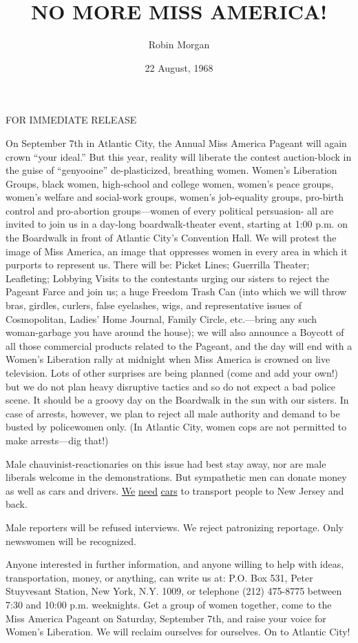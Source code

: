 \documentclass{article}
\title{NO MORE MISS AMERICA!}
\author{Robin Morgan}
\date{22 August, 1968}
\begin{document}
\maketitle

FOR IMMEDIATE RELEASE

On September 7th in Atlantic City, the Annual Miss America Pageant will again
crown ``your ideal.'' But this year, reality will liberate the contest
auction-block in the guise of ``genyooine'' de-plasticized, breathing women.
Women's Liberation Groups, black women, high-school and college women, women’s
peace groups, women's welfare and social-work groups, women's job-equality
groups, pro-birth control and pro-abortion groups---women of every political
persuasion- all are invited to join us in a day-long boardwalk-theater event,
starting at 1:00 p.m. on the Boardwalk in front of Atlantic City's Convention
Hall. We will protest the image of Miss America, an image that oppresses women
in every area in which it purports to represent us. There will be: Picket
Lines; Guerrilla Theater; Leafleting; Lobbying Visits to the contestants urging
our sisters to reject the Pageant Farce and join us; a huge Freedom Trash Can
(into which we will throw bras, girdles, curlers, false eyelashes, wigs, and
representative issues of Cosmopolitan, Ladies' Home Journal, Family Circle,
etc.---bring any such woman-garbage you have around the house); we will also
announce a Boycott of all those commercial products related to the Pageant, and
the day will end with a Women's Liberation rally at midnight when Miss America
is crowned on live television. Lots of other surprises are being planned (come
and add your own!) but we do not plan heavy disruptive tactics and so do not
expect a bad police scene. It should be a groovy day on the Boardwalk in the
sun with our sisters. In case of arrests, however, we plan to reject all male
authority and demand to be busted by policewomen only. (In Atlantic City, women
cops are not permitted to make arrests---dig that!)


Male chauvinist-reactionaries on this issue had best stay away, nor are male
liberals welcome in the demonstrations. But sympathetic men can donate money as
well as cars and drivers. \underline{We} \underline{need} \underline{cars} to
transport people to New Jersey and back.

Male reporters will be refused interviews. We reject patronizing reportage.
Only newswomen will be recognized. 

Anyone interested in further information, and anyone willing to help with
ideas, transportation, money, or anything, can write us at: P.O. Box 531, Peter
Stuyvesant Station, New York, N.Y. 1009, or telephone (212) 475-8775 between
7:30 and 10:00 p.m. weeknights.  Get a group of women together, come to the
Miss America Pageant on Saturday, September 7th, and raise your voice for
Women's Liberation.  We will reclaim ourselves for ourselves. On to Atlantic
City!
\end{document}
